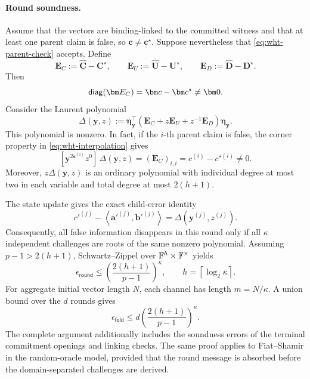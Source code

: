 \documentclass[runningheads]{llncs}
\begin{document}
\paragraph{Round soundness.}
Assume that the vectors are binding-linked to the committed witness
and that at least one parent claim is false, so
\(\bm c\ne\bm c^\star\).  Suppose nevertheless that
\eqref{eq:wht-parent-check} accepts.  Define
\[
    \bm E_C:=\widehat{\bm C}-\bm C^\star,
    \qquad
    \bm E_U:=\widehat{\bm U}-\bm U^\star,
    \qquad
    \bm E_D:=\widehat{\bm D}-\bm D^\star.
\]
Then
\[
    \diag(\bm E_C)=\bm c-\bm c^\star\ne\bm0.
\]
Consider the Laurent polynomial
\begin{equation}
    \Delta(\bm y,z)
      :=
      \bm\eta_{\bm y}^\top
      \left(\bm E_C+z\bm E_U+z^{-1}\bm E_D\right)
      \bm\eta_{\bm y}.
\label{eq:wht-error-polynomial}
\end{equation}
This polynomial is nonzero.  In fact, if the \(i\)-th parent claim is
false, the corner property in \eqref{eq:wht-interpolation} gives
\[
    [\bm y^{2\bm s^{(i)}}z^0]\,
      \Delta(\bm y,z)
      =
      (\bm E_C)_{i,i}
      =
      c^{(i)}-c^{\star(i)}
      \ne0.
\]
Moreover, \(z\Delta(\bm y,z)\) is an ordinary polynomial with
individual degree at most two in each variable and total degree at
most \(2(h+1)\).

The state update gives the exact child-error identity
\begin{equation}
    c'^{(j)}
      -
      \left\langle\bm a'^{(j)},\bm b'^{(j)}\right\rangle
      =
      \Delta(\bm y^{(j)},z^{(j)}).
\label{eq:wht-child-error-identity}
\end{equation}
Consequently, all false information disappears in this round only if
all \(\kappa\) independent challenges are roots of the same nonzero
polynomial.  Assuming \(p-1>2(h+1)\), Schwartz--Zippel over
\({\mathbb{F}}^h\times{\mathbb{F}}^\times\) yields
\[
    \boxed{
    \epsilon_{\mathsf{round}}
      \leq
      \left(\frac{2(h+1)}{p-1}\right)^\kappa,
      \qquad
      h=\left\lceil\log_2\kappa\right\rceil.
    }
\]
For aggregate initial vector length \(N\), each channel has length
\(m=N/\kappa\).  A union bound over the \(d\) rounds gives
\[
    \epsilon_{\mathsf{fold}}
      \leq
      d
      \left(\frac{2(h+1)}{p-1}\right)^\kappa.
\]
The complete argument additionally includes the soundness errors of
the terminal commitment openings and linking checks.  The same proof
applies to Fiat--Shamir in the random-oracle model, provided that the
round message is absorbed before the domain-separated challenges are
derived.
\end{document}
